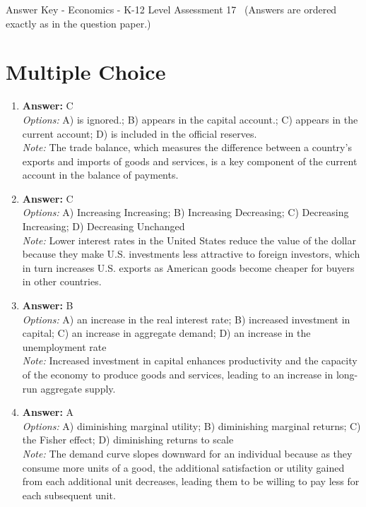 \documentclass[12pt]{article}
\begin{document}
\begin{center}
Answer Key - Economics - K-12 Level Assessment 17 \
\small (Answers are ordered exactly as in the question paper.)
\end{center}

\section*{Multiple Choice}
\begin{enumerate}[label=\arabic*.]
\item \textbf{Answer:} C
\\ \textit{Options:} A) is ignored.; B) appears in the capital account.; C) appears in the current account; D) is included in the official reserves.
\\ \textit{Note:} The trade balance, which measures the difference between a country's exports and imports of goods and services, is a key component of the current account in the balance of payments.
\item \textbf{Answer:} C
\\ \textit{Options:} A) Increasing Increasing; B) Increasing Decreasing; C) Decreasing Increasing; D) Decreasing Unchanged
\\ \textit{Note:} Lower interest rates in the United States reduce the value of the dollar because they make U.S. investments less attractive to foreign investors, which in turn increases U.S. exports as American goods become cheaper for buyers in other countries.
\item \textbf{Answer:} B
\\ \textit{Options:} A) an increase in the real interest rate; B) increased investment in capital; C) an increase in aggregate demand; D) an increase in the unemployment rate
\\ \textit{Note:} Increased investment in capital enhances productivity and the capacity of the economy to produce goods and services, leading to an increase in long-run aggregate supply.
\item \textbf{Answer:} A
\\ \textit{Options:} A) diminishing marginal utility; B) diminishing marginal returns; C) the Fisher effect; D) diminishing returns to scale
\\ \textit{Note:} The demand curve slopes downward for an individual because as they consume more units of a good, the additional satisfaction or utility gained from each additional unit decreases, leading them to be willing to pay less for each subsequent unit.

\end{enumerate}
\end{document}
